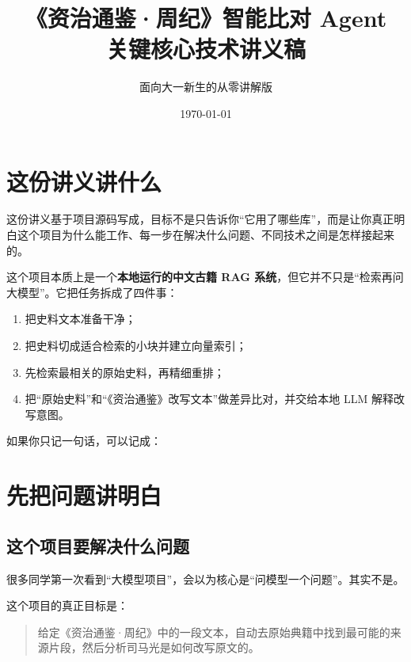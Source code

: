 \documentclass[12pt,a4paper]{ctexart}
\title{《资治通鉴·周纪》智能比对 Agent\\关键核心技术讲义稿}
\author{面向大一新生的从零讲解版}
\date{\today}
\newcommand{\term}[1]{\textbf{#1}}
\begin{document}
\maketitle
\tableofcontents
\newpage

\section{这份讲义讲什么}

这份讲义基于项目源码写成，目标不是只告诉你“它用了哪些库”，而是让你真正明白这个项目为什么能工作、每一步在解决什么问题、不同技术之间是怎样接起来的。

这个项目本质上是一个\term{本地运行的中文古籍 RAG 系统}，但它并不只是“检索再问大模型”。它把任务拆成了四件事：

\begin{enumerate}
  \item 把史料文本准备干净；
  \item 把史料切成适合检索的小块并建立向量索引；
  \item 先检索最相关的原始史料，再精细重排；
  \item 把“原始史料”和“《资治通鉴》改写文本”做差异比对，并交给本地 LLM 解释改写意图。
\end{enumerate}

如果你只记一句话，可以记成：

\begin{center}
\end{center}

\section{先把问题讲明白}

\subsection{这个项目要解决什么问题}

很多同学第一次看到“大模型项目”，会以为核心是“问模型一个问题”。其实不是。

这个项目的真正目标是：

\begin{quote}
给定《资治通鉴·周纪》中的一段文本，自动去原始典籍中找到最可能的来源片段，然后分析司马光是如何改写原文的。
\end{quote}
\end{document}
